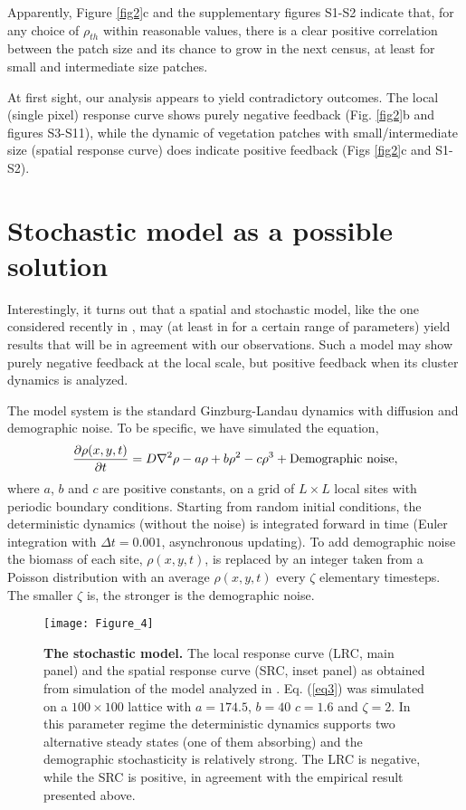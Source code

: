 \documentclass[aps,pre,twocolumn]{revtex4-1}
\begin{document}
Apparently, Figure \ref{fig2}c and  the supplementary figures S1-S2 indicate that, for any choice of $\rho_{th}$ within reasonable values, there is a clear positive correlation between the patch size and its chance to grow in the next census, at least for small and intermediate size patches.

At first sight, our analysis appears to yield contradictory outcomes. The local (single pixel) response curve shows purely negative feedback (Fig. \ref{fig2}b and figures S3-S11), while the dynamic of vegetation patches with small/intermediate  size (spatial response curve) does indicate positive feedback  (Figs \ref{fig2}c and S1-S2).

\section{Stochastic model as a possible solution}

Interestingly, it turns out that a spatial and stochastic  model, like the one considered recently in \cite{martin2015eluding,weissmann2016predicting}, may (at least in for a certain range of parameters) yield results that will be in agreement with our observations.  Such a model may show purely negative feedback at the local scale, but positive feedback when its cluster dynamics is analyzed.

The model system is the standard Ginzburg-Landau dynamics with diffusion and demographic noise. To be specific, we have simulated the equation,
\begin{equation} \label{eq3}
\frac{\partial \rho(x,y,t)}{\partial t} = D \nabla^2 \rho -a\rho + b\rho^2 -c\rho^3 + {\rm Demographic \  noise},
\end{equation}
where $a$, $b$ and $c$ are positive constants, on a grid of $L \times L$ local sites with periodic boundary conditions. Starting from random initial conditions, the deterministic dynamics (without the noise) is integrated forward in time  (Euler integration with $\Delta t = 0.001$, asynchronous updating). To add demographic noise the biomass of each site, $\rho(x,y,t)$, is replaced by an integer taken from a Poisson distribution with an average $\rho(x,y,t)$ every $\zeta$ elementary timesteps. The smaller $\zeta$ is, the stronger is the demographic noise.

\begin{figure*}
\centerline{\texttt{[image: Figure\_4]}}
\vspace{-0.cm}
\caption{\textbf{The stochastic model.} The local response curve (LRC, main panel) and the spatial response curve (SRC, inset panel) as obtained from simulation of the model analyzed in \cite{martin2015eluding,weissmann2016predicting}. Eq. (\ref{eq3}) was simulated on a $100 \times 100$ lattice with $a=174.5$, $b=40$ $c=1.6$ and $\zeta=2$.  In this parameter regime the deterministic dynamics supports    two alternative steady states (one of them absorbing) and the demographic stochasticity is relatively strong.   The LRC is negative, while the SRC is positive, in agreement with the empirical result presented above.}
 \label{fig4}
\end{figure*}
\end{document}
